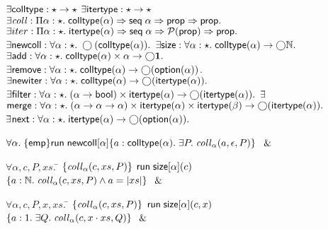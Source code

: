 \begin{figure}
\mbox{}
\begin{specification}
$\exists \mathsf{colltype} : \star \to \star$  
$\exists \mathsf{itertype} : \star \to \star$  
$\exists \mathit{coll} : 
        \Pi \alpha:\star.\; \mathsf{colltype}(\alpha) \Rightarrow \mathsf{seq}\;{\alpha} \Rightarrow \mathsf{prop} \Rightarrow \mathsf{prop}.$ 
$\exists iter : 
        \Pi \alpha:\star.\; \mathsf{itertype}(\alpha) \Rightarrow \mathsf{seq}\;{\alpha} \Rightarrow \mathcal{P}(\mathsf{prop}) \Rightarrow \mathsf{prop}.$ 
$\exists \mathsf{newcoll} : 
         \forall \alpha:\star.\; \bigcirc{(\mathsf{colltype}(\alpha))}.$
 $\exists \mathsf{size} : 
         \forall \alpha:\star.\; \mathsf{colltype}(\alpha) \to \bigcirc{\mathbb{N}}.$ 
 $\exists \mathsf{add} : 
         \forall \alpha:\star.\; \mathsf{colltype}(\alpha) \times \alpha \to \bigcirc{\mathbf{1}}.$
 $\exists \mathsf{remove} :
         \forall \alpha:\star.\; \mathsf{colltype}(\alpha) \to \bigcirc{(\mathsf{option }{(\alpha)})}$. 
 $\exists \mathsf{newiter} : 
         \forall \alpha:\star.\; \mathsf{colltype}(\alpha) \to \bigcirc{(\mathsf{itertype}(\alpha))}.$ 
 $\exists \mathsf{filter} : 
         \forall \alpha:\star.\; (\alpha \to \mathsf{bool}) \times \mathsf{itertype}(\alpha) 
                                 \to \bigcirc{(\mathsf{itertype}(\alpha))}.$ 
$\exists$\=$ \mathsf{merge} : 
         \forall \alpha:\star.\; (\alpha \to \alpha \to \alpha) \times
                                 \mathsf{itertype}(\alpha) \times \mathsf{itertype}(\beta) 
                                   \to \bigcirc{(\mathsf{itertype}(\alpha))}.$
$\exists$\=$\mathsf{next} : 
         \forall \alpha:\star.\; \mathsf{itertype}(\alpha) \to \bigcirc{(\mathsf{option }{(\alpha)})}.$  

\> $\forall \alpha.\; \{{\mathsf{emp}}\}{\mathsf{run}\;{\mathsf{newcoll}[\alpha]}}\{{a:\mathsf{colltype}(\alpha)}.\;{\exists P.\; \mathit{coll}_\alpha(a, \epsilon,P)}\}$ $\;\&\;$ 

\> $\forall \alpha, c, P, xs.\;$\=
         $\{{\mathit{coll}_\alpha(c, xs, P)}\}$
\nextline
\> \>  $\mathsf{run}\;{\mathsf{size}[\alpha](c)}$ 
\nextline
\> \>  $\{{a:\mathbb{N}.\; \mathit{coll}_\alpha(c, xs, P) \land a = |xs|}\}$  $\;\&\;$ 

 \> $\forall \alpha, c, P, x, xs.\;$\=
               $\{{\mathit{coll}_\alpha(c, xs, P)}\}$ 
\nextline
\>\>         $\mathsf{run}\;{\mathsf{size}[\alpha](c, x)}$
\nextline
\>\>         $\{{a:1.\; \exists Q.\; \mathit{coll}_\alpha(c, x\cdot xs, Q)}\}$ $\;\&\;$ 


\end{specification}
\end{figure}
